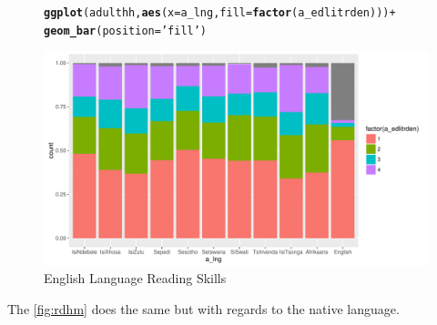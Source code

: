 \documentclass[a4paper,british]{article}\usepackage[]{graphicx}\usepackage[]{color}
\makeatletter
\def\maxwidth{ %
  \ifdim\Gin@nat@width>\linewidth
    \linewidth
  \else
    \Gin@nat@width
  \fi
}
\newcommand{\hlstr}[1]{\textcolor[rgb]{0.192,0.494,0.8}{#1}}%
\newcommand{\hlopt}[1]{\textcolor[rgb]{0,0,0}{#1}}%
\newcommand{\hlstd}[1]{\textcolor[rgb]{0.345,0.345,0.345}{#1}}%
\newcommand{\hlkwc}[1]{\textcolor[rgb]{0.333,0.667,0.333}{#1}}%
\newcommand{\hlkwd}[1]{\textcolor[rgb]{0.737,0.353,0.396}{\textbf{#1}}}%
\newenvironment{kframe}{%
 \def\at@end@of@kframe{}%
 \ifinner\ifhmode%
  \def\at@end@of@kframe{\end{minipage}}%
  \begin{minipage}{\columnwidth}%
 \fi\fi%
 \def\FrameCommand##1{\hskip\@totalleftmargin \hskip-\fboxsep
 \colorbox{shadecolor}{##1}\hskip-\fboxsep
     \hskip-\linewidth \hskip-\@totalleftmargin \hskip\columnwidth}%
 \MakeFramed {\advance\hsize-\width
   \@totalleftmargin\z@ \linewidth\hsize
   \@setminipage}}%
 {\par\unskip\endMakeFramed%
 \at@end@of@kframe}
\newenvironment{knitrout}{}{} %
\let\ref\autoref
\makeatother
\begin{document}
\begin{figure}[H]
\caption{English Language Reading Skills}
\label{fig:rden}

\begin{knitrout}
\color{fgcolor}\begin{kframe}
\begin{alltt}
\hlkwd{ggplot}\hlstd{(adulthh,} \hlkwd{aes}\hlstd{(}\hlkwc{x} \hlstd{= a_lng,} \hlkwc{fill} \hlstd{=} \hlkwd{factor}\hlstd{(a_edlitrden)) )} \hlopt{+}
        \hlkwd{geom_bar}\hlstd{(}\hlkwc{position} \hlstd{=} \hlstr{'fill'}\hlstd{)}
\end{alltt}
\end{kframe}
\includegraphics[width=\maxwidth]{../Making-Next-Billion-Demand-Access/misc/latex-read_english-1} 

\end{knitrout}
\end{figure}

The \ref{fig:rdhm} does the same but with regards to the native language.
\end{document}

